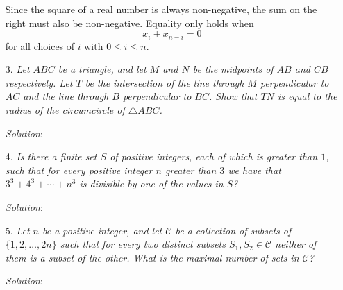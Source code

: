 \documentclass{article}
\begin{document}
\begin{enumerate}
  Since the square of a real number is always non-negative, the sum on the right must also be non-negative. Equality only holds when
  $$x_i + x_{n - i} = 0$$
  for all choices of $i$ with $0 \le i \le n$.
  


\item[3.] %
\textit{Let $ABC$ be a triangle, and let $M$ and $N$ be the midpoints of $AB$ and $CB$ respectively.
Let $T$ be the intersection of the line through $M$ perpendicular to $AC$ and the line through $B$ perpendicular to $BC$.
Show that $TN$ is equal to the radius of the circumcircle of $\triangle ABC$.}

\textit{Solution}:


\item[4.] %
\textit{Is there a finite set $S$ of positive integers, each of which is greater than $1$, such that for every positive integer $n$ greater than $3$ we have that $3^3 +4^3 +\dotsb +n^3$ is divisible by one of the values in $S$?}

\textit{Solution}:


\item[5.] %
\textit{\newcommand{\CC}{\mathcal{C}}
Let $n$ be a positive integer, and let $\CC$ be a collection of subsets of $\{1, 2, \dotsc, 2n\}$ such that for every two distinct subsets $S_1, S_2 \in \CC$ neither of them is a subset of the other.
What is the maximal number of sets in $\CC$?}

\textit{Solution}:


\end{enumerate}
\end{document}
